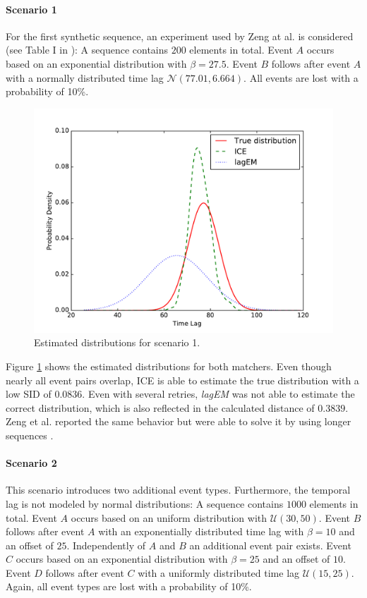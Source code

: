 \documentclass[conference]{IEEEtran}
\theoremstyle{examplestyle}
\begin{document}
\paragraph{Scenario 1}
For the first synthetic sequence, an experiment used by Zeng at al. \cite{Zeng2015} is considered (see Table I in \cite{Zeng2015}): A sequence contains $200$ elements in total. Event \(A\) occurs based on an exponential distribution with \(\beta = 27.5\). Event \(B\) follows after event \(A\) with a normally distributed time lag \(\mathcal{N}(77.01, 6.664)\). All events are lost with a probability of 10\%.


\begin{figure}[!tb]
	\centering
	\includegraphics[scale=0.4]{images/scenarios/1.pdf}
	\caption{Estimated distributions for scenario 1.}
	\label{fig:scen1}
\end{figure}

Figure \ref{fig:scen1} shows the estimated distributions for both matchers. Even though nearly all event pairs overlap, \ac{ICE} is able to estimate the true distribution with a low \ac{SID} of $0.0836$. Even with several retries, \textit{lagEM} was not able to estimate the correct distribution, which is also reflected in the calculated distance of $0.3839$. Zeng et al. reported the same behavior but were able to solve it by using longer sequences \cite{Zeng2015}.



\paragraph{Scenario 2}
This scenario introduces two additional event types. Furthermore, the temporal lag is not modeled by normal distributions: A sequence contains $1000$ elements in total. Event \(A\) occurs based on an uniform distribution with \(\mathcal{U}(30, 50)\). Event \(B\) follows after event \(A\) with an exponentially distributed time lag with \(\beta = 10\) and an offset of $25$. Independently of \(A\) and \(B\) an additional event pair exists. Event \(C\) occurs based on an exponential distribution with \(\beta = 25\) and an offset of $10$. Event \(D\) follows after event \(C\) with a uniformly distributed time lag \(\mathcal{U}(15, 25)\). Again, all event types are lost with a probability of 10\%.
\end{document}
